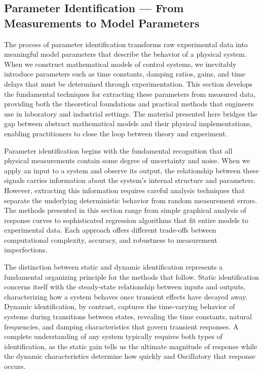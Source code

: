 \subsection{Parameter Identification — From Measurements to Model Parameters}

The process of parameter identification transforms raw experimental data into meaningful model parameters that describe the behavior of a physical system. When we construct mathematical models of control systems, we inevitably introduce parameters such as time constants, damping ratios, gains, and time delays that must be determined through experimentation. This section develops the fundamental techniques for extracting these parameters from measured data, providing both the theoretical foundations and practical methods that engineers use in laboratory and industrial settings. The material presented here bridges the gap between abstract mathematical models and their physical implementations, enabling practitioners to close the loop between theory and experiment.

Parameter identification begins with the fundamental recognition that all physical measurements contain some degree of uncertainty and noise. When we apply an input to a system and observe its output, the relationship between these signals carries information about the system's internal structure and parameters. However, extracting this information requires careful analysis techniques that separate the underlying deterministic behavior from random measurement errors. The methods presented in this section range from simple graphical analysis of response curves to sophisticated regression algorithms that fit entire models to experimental data. Each approach offers different trade-offs between computational complexity, accuracy, and robustness to measurement imperfections.

The distinction between static and dynamic identification represents a fundamental organizing principle for the methods that follow. Static identification concerns itself with the steady-state relationship between inputs and outputs, characterizing how a system behaves once transient effects have decayed away. Dynamic identification, by contrast, captures the time-varying behavior of systems during transitions between states, revealing the time constants, natural frequencies, and damping characteristics that govern transient responses. A complete understanding of any system typically requires both types of identification, as the static gain tells us the ultimate magnitude of response while the dynamic characteristics determine how quickly and Oscillatory that response occurs.

